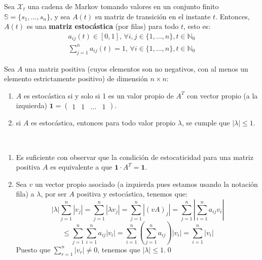 \begin{definition}
Sea $\mathcal{X}_t$ una cadena de Markov tomando valores en un conjunto finito $\mathbb{S}=\{s_1,...,s_n\}$, y sea $A(t)$ su matriz de transición en el instante $t$. Entonces, $A(t)$ es una \textbf{matriz estocástica} (por filas) para todo $t$, esto es:
\begin{align*}
a_{ij}(t)\in[0,1],\, \forall i,j \in \{1,...,n\}, t\in\mathbb{N}_0\\
\sum_{j=1}^n a_{ij}(t)=1, \, \forall i\in\{1,...,n\}, t\in\mathbb{N}_0
\end{align*}
\end{definition}

\begin{proposition}\label{propiedadMatrizEstocástica}
    
Sea $A$ una matriz positiva (cuyos elementos son no negativos, con al menos un elemento estrictamente positivo) de dimensión $n\times n$:
\begin{enumerate}
    \item $A$ es estocástica si y solo si 1 es un valor propio de $A^T$ con vector propio (a la izquierda) $\mathbf{1}=\begin{pmatrix}1 & 1 & \dots & 1\end{pmatrix}$.
    \item si $A$ es estocástica, entonces para todo valor propio $\lambda$, se cumple que  $\left|\lambda\right|\leq1.$
\end{enumerate}
\end{proposition}

\begin{proofs*}
\
\begin{enumerate}
    \item Es suficiente con observar que la condición de estocaticidad para una matriz positiva $A$ es equivalente a que $\mathbf{1}\cdot A^T=\mathbf{1}$.
    \item Sea $v$ un vector propio asociado (a izquierda pues estamos usando la notación fila) a $\lambda$, por ser $A$ positiva y estocástica, tenemos que:
    \[
    \left|\lambda\right|\sum_{j=1}^n\left| v_j\right|=\sum_{j=1}^n\left|\lambda v_j\right|= \sum_{j=1}^n\left|(vA)_j \right|  =\sum_{j=1}^n\left|\sum_{i=1}^n a_{ij}v_i\right|\]
    \[\leq\sum_{j=1}^n\sum_{i=1}^n a_{ij}\left|v_i\right|=\sum_{i=1}^n\left( \sum_{j=1}^n a_{ij} \right) \left|v_i\right|=\sum_{i=1}^n\left|v_i\right|\]
    Puesto que $\sum_{r=1}^n\left|v_r\right|\neq0$, tenemos que $\left|\lambda\right|\leq1$.\qed
\end{enumerate}
\end{proofs*}

